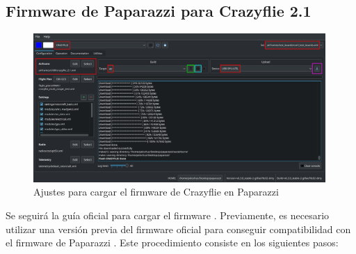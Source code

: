 
\subsection{Firmware de Paparazzi para Crazyflie 2.1}

\begin{figure}[h]
    \centering
    \includegraphics[width=0.99\textwidth]{img/fig/fig2.7-flash-paparazzi.png}
    \caption{Ajustes para cargar el firmware de Crazyflie en Paparazzi}
    \label{fig:upload-firmware-crazyflie}
\end{figure}

Se seguirá la guía oficial para cargar el firmware \cite{paparazzi_crazyflie}. Previamente, es necesario utilizar una versión previa del firmware oficial para conseguir compatibilidad con el firmware de Paparazzi \cite{crazyflie-firmware-fix}.
Este procedimiento consiste en los siguientes pasos:

